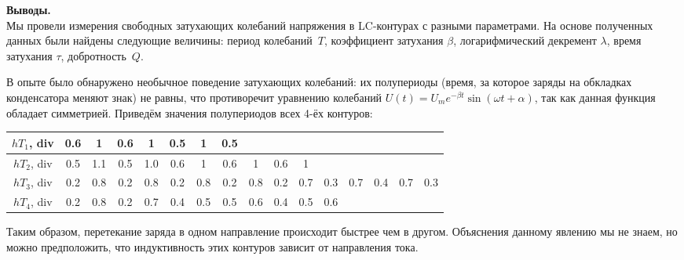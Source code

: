 \documentclass[ a4paper]{article}
\begin{document}
{\parindent=0pt\textbf{Выводы.}}\\
Мы провели измерения свободных затухающих колебаний напряжения в LC-контурах с разными параметрами. 
На основе полученных данных были найдены следующие величины: период колебаний~$T$, коэффициент затухания $\beta$, 
логарифмический декремент $\lambda$, время затухания $\tau$, добротность~$Q$.

В опыте было обнаружено необычное  поведение затухающих колебаний: их полупериоды (время, за которое заряды на обкладках конденсатора меняют знак) 
не равны, что противоречит уравнению колебаний $U(t)=U_me^{-\beta t}\sin(\omega t + \alpha)$, так как данная функция обладает симметрией. 
Приведём значения полупериодов всех 4-ёх контуров:
\begin{center}
	\begin{tabular}{|c|c|c|c|c|c|c|c|c|c|c|c|c|c|c|c|}
		\hline
		$hT_1$, div&  0.6& 1 & 0.6& 1 & 0.5& 1 & 0.5& & & & & & && \\
		\hline
		$hT_2$, div&  0.5& 1.1& 0.5& 1.0 & 0.6& 1 & 0.6& 1 & 0.6& 1 & & & && \\
		\hline
		$hT_3$, div& 0.2& 0.8& 0.2& 0.8& 0.2& 0.8& 0.2& 0.8& 0.2& 0.7& 0.3& 0.7& 0.4& 0.7& 0.3 \\
		\hline
		$hT_4$, div&0.2& 0.8& 0.2& 0.7& 0.4& 0.5& 0.5& 0.6& 0.4& 0.5& 0.6& & & &\\
		\hline
	\end{tabular}
\end{center}
Таким образом, перетекание заряда в одном направление происходит быстрее чем в другом. 
Объяснения данному явлению мы не знаем, но можно предположить, что индуктивность этих контуров зависит от направления тока.
	
\end{document}
